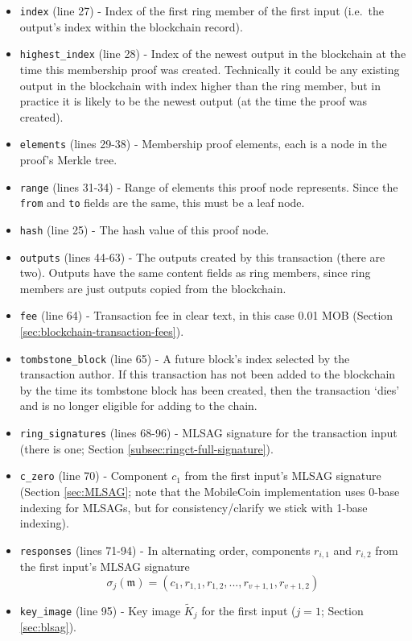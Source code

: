\begin{appendices}
\begin{itemize}
	\item {\tt index} (line 27) - Index of the first ring member of the first input (i.e.\ the output's index within the blockchain record).
	\item {\tt highest\_index} (line 28) - Index of the newest output in the blockchain at the time this membership proof was created. Technically it could be any existing output in the blockchain with index higher than the ring member, but in practice it is likely to be the newest output (at the time the proof was created).
	\item {\tt elements} (lines 29-38) - Membership proof elements, each is a node in the proof's Merkle tree.
	\item {\tt range} (lines 31-34) - Range of elements this proof node represents. Since the {\tt from} and {\tt to} fields are the same, this must be a leaf node.
    \item {\tt hash} (line 25) - The hash value of this proof node.

    \item {\tt outputs} (lines 44-63) - The outputs created by this transaction (there are two). Outputs have the same content fields as ring members, since ring members are just outputs copied from the blockchain.
    \item {\tt fee} (line 64) - Transaction fee in clear text, in this case 0.01 MOB (Section \ref{sec:blockchain-transaction-fees}).
    \item {\tt tombstone\_block} (line 65) - A future block’s index selected by the transaction author. If this transaction has not been added to the blockchain by the time its tombstone block has been created, then the transaction `dies’ and is no longer eligible for adding to the chain.

    \item {\tt ring\_signatures} (lines 68-96) - MLSAG signature for the transaction input (there is one; Section \ref{subsec:ringct-full-signature}).
    \item {\tt c\_zero} (line 70) - Component \(c_1\) from the first input's MLSAG signature (Section \ref{sec:MLSAG}; note that the MobileCoin implementation uses 0-base indexing for MLSAGs, but for consistency/clarify we stick with 1-base indexing).
    \item {\tt responses} (lines 71-94) - In alternating order, components \(r_{i,1}\) and \(r_{i,2}\) from the first input's MLSAG signature
    \[\sigma_j(\mathfrak{m}) = (c_1, r_{1, 1}, r_{1, 2}, ..., r_{v+1, 1}, r_{v+1, 2})\]
    \item {\tt key\_image} (line 95) - Key image $\tilde{K}_j$ for the first input ($j = 1$; Section \ref{sec:blsag}).


\end{itemize}
\end{appendices}
